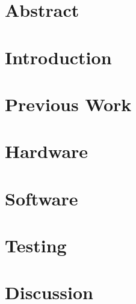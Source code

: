 \section{Abstract}
\section{Introduction}
\section{Previous Work}
\section{Hardware}
\section{Software}
\section{Testing}
\section{Discussion}